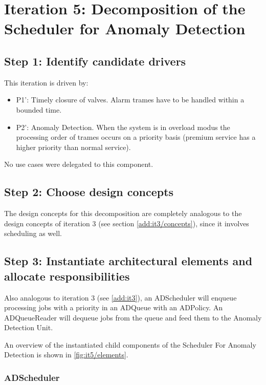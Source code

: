 \section{Iteration 5: Decomposition of the Scheduler for Anomaly Detection}
\label{add:it5}

\subsection{Step 1: Identify candidate drivers}
\label{add:it5/drivers}

\npar This iteration is driven by:

\begin{itemize}
	\item P1': Timely closure of valves. Alarm trames have to be handled within a bounded time. 
	\item P2': Anomaly Detection. When the system is in overload modus the processing order of trames
	  occurs on a priority basis (premium service has a higher priority than
	  normal service).
\end{itemize}

\npar No use cases were delegated to this component.

\subsection{Step 2: Choose design concepts}
\label{add:it5/concepts}

\npar The design concepts for this decomposition are completely analogous to the
design concepts of iteration 3 (see section \ref{add:it3/concepts}), since it
involves scheduling as well.

\subsection{Step 3: Instantiate architectural elements and allocate responsibilities}
\label{add:it5/elements}

\npar Also analogous to iteration 3 (see \ref{add:it3}), an ADScheduler will
enqueue processing jobs with a priority in an ADQueue with an ADPolicy. An
ADQueueReader will dequeue jobs from the queue and feed them
to the Anomaly Detection Unit. 

\npar An overview of the instantiated child components of the Scheduler
For Anomaly Detection is shown in \ref{fig:it5/elements}.

\subsubsection{ADScheduler}

